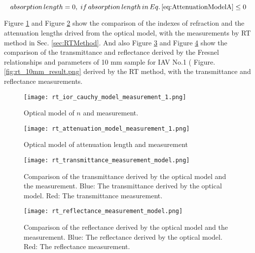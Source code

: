 \begin{equation}
\label{eq:AttenuationModelB}
absorption\,length = 0,\;if\,absorption\,length\,in\,Eq.\,\ref{eq:AttenuationModelA}\leq0
\end{equation}


Figure \ref{fig:rt_ior_cauchy_model_measurement_1} and Figure \ref{fig:rt_attenuation_model_measurement_1} show the comparison of the indexes of refraction and the attenuation lengths drived from the
optical model, with the measurements by RT method in Sec. \ref{sec:RTMethod}.
And also Figure \ref{fig:rt_transmittance_measurement_model} and Figure \ref{fig:rt_reflectance_measurement_model} show the comparison of the transmittance
and reflectance derived by the Fresnel relationships and parameters
of 10 mm sample for IAV No.1 ( Figure. \ref{fig:rt_10mm_result.png}
derived by the RT method, with the transmittance and reflectance measurements.




\begin{figure}
    \centering
    \texttt{[image: rt\_ior\_cauchy\_model\_measurement\_1.png]}
    \caption[Optical model of $n$ and measurement]{Optical model of $n$ and measurement.}
    \label{fig:rt_ior_cauchy_model_measurement_1}
    \end{figure}



\begin{figure}
    \centering
    \texttt{[image: rt\_attenuation\_model\_measurement\_1.png]}
    \caption[Optical model of attenuation length and measurement]{Optical model of attenuation length and measurement}
    \label{fig:rt_attenuation_model_measurement_1}
    \end{figure}


\begin{figure}
    \centering
    \texttt{[image: rt\_transmittance\_measurement\_model.png]}
    \caption[Comparison of the transmittance derived by the optical model and the measurement]
{
Comparison of the transmittance derived by the optical model and the measurement.
Blue: The transmittance derived by the optical model.
Red: The transmittance measurement.
}
    \label{fig:rt_transmittance_measurement_model}
    \end{figure}


\begin{figure}
    \centering
    \texttt{[image: rt\_reflectance\_measurement\_model.png]}
    \caption[Comparison of the reflectance derived by the optical model and the measurement.]
{
Comparison of the reflectance derived by the optical model and the measurement.
Blue: The reflectance derived by the optical model.
Red: The reflectance measurement.
}
    \label{fig:rt_reflectance_measurement_model}
    \end{figure}



